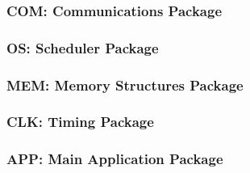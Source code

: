 \subsubsection{COM: Communications Package}
%
\subsubsection{OS: Scheduler Package}
%
\subsubsection{MEM: Memory Structures Package}
%
\subsubsection{CLK: Timing Package}
%
\subsubsection{APP: Main Application Package}
%